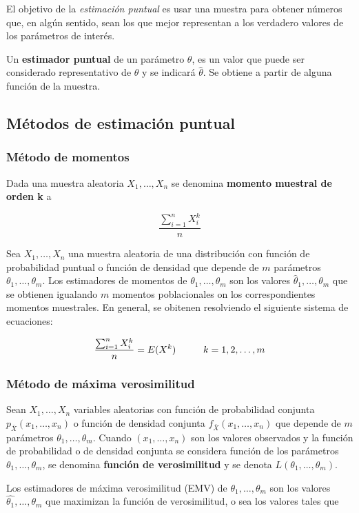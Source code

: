 El objetivo de la \textit{estimación puntual} es usar una muestra para obtener números que, en algún sentido, sean los que mejor representan a los verdadero valores de los parámetros de interés.

Un \textbf{estimador puntual} de un parámetro $\theta$, es un valor que puede ser considerado representativo de $\theta$ y se indicará $\hat{\theta}$. Se obtiene a partir de alguna función de la muestra.

\subsection{Métodos de estimación puntual}

\subsubsection{Método de momentos} 
Dada una muestra aleatoria $X_1,\dots,X_n$ se denomina \textbf{momento muestral de orden k} a 

$$\frac{\sum_{i=1}^{n} X_i^k}{n}$$

Sea $X_1,\dots,X_n$ una muestra aleatoria de una distribución con función de probabilidad puntual o función de densidad que depende de $m$ parámetros $\theta_1,\dots,\theta_m$. Los estimadores de momentos de $\theta_1,\dots,\theta_m$ son los valores $\hat{\theta}_1,\dots,{\theta}_m$ que se obtienen igualando $m$ momentos poblacionales on los correspondientes momentos muestrales. En general, se obitenen resolviendo el siguiente sistema de ecuaciones:

$$\frac{\sum_{i=1}^{n} X_i^k}{n} = E(X^k) \hspace*{1cm} k=1,2,\dots,m$$

\subsubsection{Método de máxima verosimilitud}
Sean $X_1,\dots,X_n$ variables aleatorias con función de probabilidad conjunta $p_{\bar{X}}(x_1,\dots,x_n)$ o función de densidad conjunta $f_{\bar{X}}(x_1,\dots,x_n)$ que depende de $m$ parámetros $\theta_1,\dots,\theta_m$. Cuando $(x_1,\dots,x_n)$ son los valores observados y la función de probabilidad o de densidad conjunta se considera función de los parámetros $\theta_1,\dots,\theta_m$, se denomina \textbf{función de verosimilitud} y se denota $L(\theta_1,\dots,\theta_m)$.

Los estimadores de máxima verosimilitud (EMV) de $\theta_1,\dots,\theta_m$ son los valores $\hat{\theta_1},\dots,{\theta_m}$ que maximizan la función de verosimilitud, o sea los valores tales que

